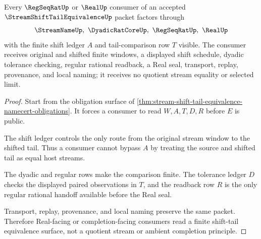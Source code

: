 \begin{theorem}
\label{thm:stream-shift-tail-equivalence-regular-handoff}
Every $\RegSeqRatUp$ or $\RealUp$ consumer of an accepted $\StreamShiftTailEquivalenceUp$ packet factors through
$$
\StreamNameUp,\ \DyadicRatCoreUp,\ \RegSeqRatUp,\ \RealUp
$$
with the finite shift ledger $A$ and tail-comparison row $T$ visible. The consumer receives original and shifted finite windows, a displayed shift schedule, dyadic tolerance checking, regular rational readback, a Real seal, transport, replay, provenance, and local naming; it receives no quotient stream equality or selected limit.
\end{theorem}
\begin{proof}
Start from the obligation surface of \autoref{thm:stream-shift-tail-equivalence-namecert-obligations}. It forces a consumer to read $W,A,T,D,R$ before $E$ is public.

The shift ledger controls the only route from the original stream window to the shifted tail. Thus a consumer cannot bypass $A$ by treating the source and shifted tail as equal host streams.

The dyadic and regular rows make the comparison finite. The tolerance ledger $D$ checks the displayed paired observations in $T$, and the readback row $R$ is the only regular rational handoff available before the Real seal.

Transport, replay, provenance, and local naming preserve the same packet. Therefore Real-facing or completion-facing consumers read a finite shift-tail equivalence surface, not a quotient stream or ambient completion principle.
\end{proof}



